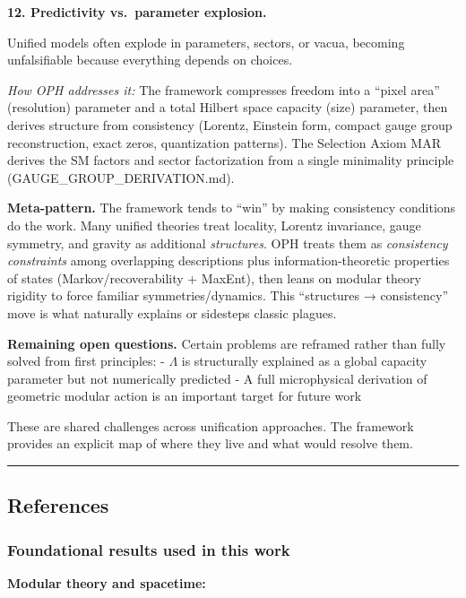 \documentclass[
]{article}
\begin{document}
\textbf{12. Predictivity vs.~parameter explosion.}

Unified models often explode in parameters, sectors, or vacua, becoming
unfalsifiable because everything depends on choices.

\emph{How OPH addresses it:} The framework compresses freedom into a
``pixel area'' (resolution) parameter and a total Hilbert space capacity
(size) parameter, then derives structure from consistency (Lorentz,
Einstein form, compact gauge group reconstruction, exact zeros,
quantization patterns). The Selection Axiom MAR derives the SM factors
and sector factorization from a single minimality principle
(GAUGE\_GROUP\_DERIVATION.md).

\textbf{Meta-pattern.} The framework tends to ``win'' by making
consistency conditions do the work. Many unified theories treat
locality, Lorentz invariance, gauge symmetry, and gravity as additional
\emph{structures}. OPH treats them as \emph{consistency constraints}
among overlapping descriptions plus information-theoretic properties of
states (Markov/recoverability + MaxEnt), then leans on modular theory
rigidity to force familiar symmetries/dynamics. This ``structures →
consistency'' move is what naturally explains or sidesteps classic
plagues.

\textbf{Remaining open questions.} Certain problems are reframed rather
than fully solved from first principles: - \(\Lambda\) is structurally
explained as a global capacity parameter but not numerically predicted -
A full microphysical derivation of geometric modular action is an
important target for future work

These are shared challenges across unification approaches. The framework
provides an explicit map of where they live and what would resolve them.

\begin{center}\rule{0.5\linewidth}{0.5pt}\end{center}

\subsection{References}\label{references}

\subsubsection{Foundational results used in this
work}\label{foundational-results-used-in-this-work}

\textbf{Modular theory and spacetime:}
\end{document}
